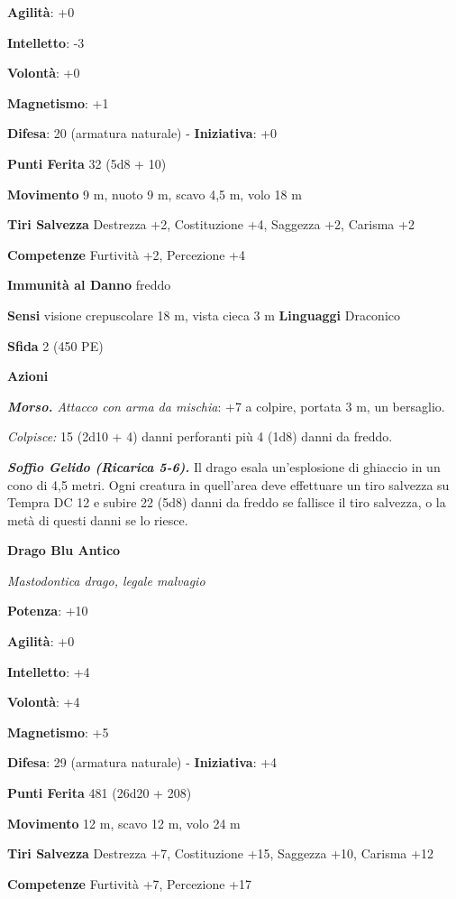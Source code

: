 \begin{multicols}{2}
\textbf{Agilità}: +0

\textbf{Intelletto}: -3

\textbf{Volontà}: +0

\textbf{Magnetismo}: +1

\textbf{Difesa}: 20 (armatura naturale) - \textbf{Iniziativa}: +0

\textbf{Punti Ferita} 32 (5d8 + 10)

\textbf{Movimento} 9 m, nuoto 9 m, scavo 4,5 m, volo 18 m

\textbf{Tiri Salvezza} Destrezza +2, Costituzione +4, Saggezza +2,
Carisma +2

\textbf{Competenze} Furtività +2, Percezione +4

\textbf{Immunità al Danno} freddo

\textbf{Sensi} visione crepuscolare 18 m, vista cieca 3 m
\textbf{Linguaggi} Draconico

\textbf{Sfida} 2 (450 PE)\smallskip

\smallskip\textbf{Azioni}

\emph{\textbf{Morso.} Attacco con arma da mischia}: +7 a colpire,
portata 3 m, un bersaglio.

\emph{Colpisce:} 15 (2d10 + 4) danni perforanti più 4 (1d8) danni da
freddo.

\emph{\textbf{Soffio Gelido (Ricarica 5-6).}} Il drago esala
un'esplosione di ghiaccio in un cono di 4,5 metri. Ogni creatura in
quell'area deve effettuare un tiro salvezza su Tempra DC 12 e
subire 22 (5d8) danni da freddo se fallisce il tiro salvezza, o la metà
di questi danni se lo riesce.



\textbf{Drago Blu Antico}

\emph{Mastodontica drago, legale malvagio}

\textbf{Potenza}: +10

\textbf{Agilità}: +0

\textbf{Intelletto}: +4

\textbf{Volontà}: +4

\textbf{Magnetismo}: +5

\textbf{Difesa}: 29 (armatura naturale) - \textbf{Iniziativa}: +4

\textbf{Punti Ferita} 481 (26d20 + 208)

\textbf{Movimento} 12 m, scavo 12 m, volo 24 m

\textbf{Tiri Salvezza} Destrezza +7, Costituzione +15, Saggezza +10,
Carisma +12

\textbf{Competenze} Furtività +7, Percezione +17


\end{multicols}
